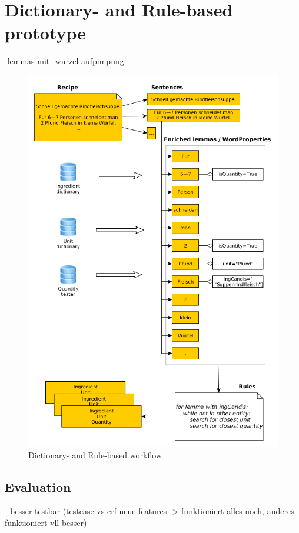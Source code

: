 \documentclass[12pt, twoside]{report}
\begin{document}
\section{Dictionary- and Rule-based prototype}
-lemmas mit -wurzel aufpimpung

\begin{figure}
	\includegraphics[width=1\linewidth]{Images/dictBasedExtraction}
	\caption{Dictionary- and Rule-based workflow}
	\label{fig:workflowDictbased}
\end{figure}


\subsection{Evaluation}
- besser testbar (testcase vs crf neue features -> funktioniert alles noch, anderes funktioniert vll besser)
\end{document}

